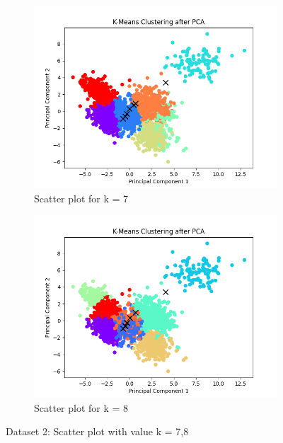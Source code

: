 \documentclass[12pt]{report}
\begin{document}
	\begin{figure}[H]
		\centering
		\begin{subfigure}{.5\textwidth}
			\centering
			\includegraphics[width=.9\linewidth]{../K-means/Output/Dataset2/scatterPlot_k=7.png}
			\caption{Scatter plot for k = 7}
			\label{Dataset2Scatterplotk7}
		\end{subfigure}%
		\begin{subfigure}{.5\textwidth}
			\centering
			\includegraphics[width=.9\linewidth]{../K-means/Output/Dataset2/scatterPlot_k=8.png}
			\caption{Scatter plot for k = 8}
			\label{Dataset2Scatterplotk8}
		\end{subfigure}
		\caption{Dataset 2: Scatter plot with value k = 7,8}
		\label{Dataset2Scatterplot78}
	\end{figure}
\end{document}
